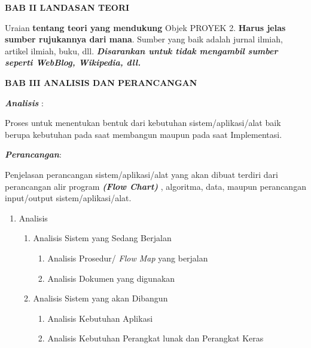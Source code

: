 \begin{enumerate}
\begin{enumerate} [label=1.\arabic*]
 	\end{enumerate}
 	
 \par \textbf{BAB II LANDASAN TEORI} \par 
 
 	Uraian	 \textbf{tentang	 teori yang	 mendukung} Objek	 PROYEK 2.	 \textbf{Harus	jelas	 sumber	 rujukannya	 dari	 mana}. Sumber	 yang	 baik	 adalah	jurnal	 ilmiah,	 artikel	 ilmiah,	 buku,	 dll.	 \textit{\textbf{Disarankan	 untuk	 tidak	mengambil	sumber	seperti	WebBlog,	Wikipedia,	dll.}} \\
 	
 	\par \textbf{BAB III ANALISIS DAN PERANCANGAN} \par 
 	\textit{\textbf{Analisis}} : \par 
 	Proses	 untuk	 menentukan	 bentuk	 dari	 kebutuhan	
sistem/aplikasi/alat	 baik	 berupa	 kebutuhan	 pada	 saat	membangun	
maupun	pada	saat	Implementasi.

	\textit{\textbf{Perancangan}}: \par 
	Penjelasan	 perancangan	 	 sistem/aplikasi/alat	 	 yang	 akan	 dibuat	terdiri	dari	perancangan	alir	program \textit{\textbf{(Flow	Chart)}}	, algoritma,	data,	maupun	perancangan	input/output	sistem/aplikasi/alat.		
 	
	
	\begin{enumerate} [label=3.\arabic*]
		\item Analisis
			\begin{enumerate} [label=3.1.\arabic*]
				\item Analisis	Sistem	yang	Sedang	Berjalan
					\begin{enumerate} [label=3.1.1.\arabic*]
						\item Analisis	Prosedur/ \textit{Flow	Map} yang								  berjalan
						\item Analisis	Dokumen	yang digunakan
					\end{enumerate}
				\item Analisis	Sistem	yang	akan	Dibangun
					\begin{enumerate} [label=3.1.2.\arabic*]
						\item Analisis	Kebutuhan	Aplikasi
						\item Analisis	Kebutuhan	Perangkat	lunak									  dan	Perangkat Keras
					\end{enumerate}
			\end{enumerate}
			

\end{enumerate}
\end{enumerate}
